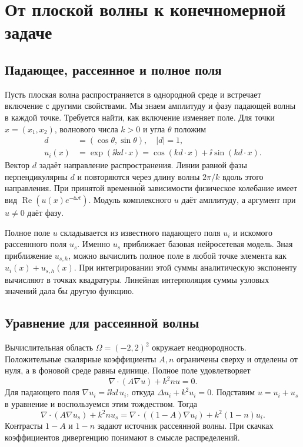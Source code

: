 \chapter{От плоской волны к конечномерной задаче}
\label{math:fem}
\label{math:chapter}

\section{Падающее, рассеянное и полное поля}
Пусть плоская волна распространяется в однородной среде и встречает
включение с другими свойствами. Мы знаем амплитуду и фазу падающей
волны в каждой точке. Требуется найти, как включение изменяет поле.
Для точки $x=(x_1,x_2)$, волнового числа $k>0$ и угла $\theta$
положим
\begin{align}
 d&=(\cos\theta,\sin\theta),\quad |d|=1,\label{math:direction}\\
 u_i(x)&=\exp(\ii k d\cdot x)
       =\cos(kd\cdot x)+\ii\sin(kd\cdot x).\label{math:incident}
\end{align}
Вектор $d$ задаёт направление распространения. Линии равной фазы
перпендикулярны $d$ и повторяются через длину волны $2\pi/k$ вдоль
этого направления. При принятой временно́й зависимости физическое
колебание имеет вид $\operatorname{Re}(u(x)e^{-\ii\omega t})$.
Модуль комплексного $u$ даёт амплитуду, а аргумент при $u\ne0$ даёт фазу.

Полное поле $u$ складывается из известного падающего поля $u_i$ и
искомого рассеянного поля $u_s$. Именно $u_s$ приближает базовая
нейросетевая модель. Зная приближение $u_{s,h}$, можно вычислить полное
поле в любой точке элемента как $u_i(x)+u_{s,h}(x)$. При интегрировании
этой суммы аналитическую экспоненту вычисляют в точках квадратуры.
Линейная интерполяция суммы узловых значений дала бы другую функцию.

\section{Уравнение для рассеянной волны}
Вычислительная область $\Omega=(-2,2)^2$ окружает неоднородность.
Положительные скалярные коэффициенты $A,n$ ограничены сверху и отделены
от нуля, а в фоновой среде равны единице. Полное поле удовлетворяет
\begin{equation}
 \nabla\cdot(A\nabla u)+k^2nu=0.\label{math:total-pde}
\end{equation}
Для падающего поля $\nabla u_i=\ii k d\,u_i$, откуда
$\Delta u_i+k^2u_i=0$. Подставим $u=u_i+u_s$ в уравнение и воспользуемся
этим тождеством. Тогда
\begin{equation}
 \nabla\cdot(A\nabla u_s)+k^2nu_s
 =\nabla\cdot((1-A)\nabla u_i)+k^2(1-n)u_i.\label{math:scattered-pde}
\end{equation}
Контрасты $1-A$ и $1-n$ задают источник рассеянной волны.
При скачках коэффициентов дивергенцию понимают в смысле распределений.

